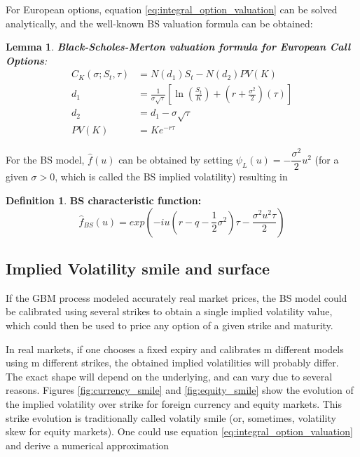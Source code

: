 \documentclass[12,twoside]{mammeTFM}
\newtheorem{lem}[thm]{Lemma}
\theoremstyle{definition}
\newtheorem{definition}[thm]{Definition}
\theoremstyle{remark}
\begin{document}
For European options, equation \ref{eq:integral_option_valuation} can be solved analytically, and the well-known BS valuation formula can be obtained:

\begin{lem} \textbf{Black-Scholes-Merton valuation formula for European Call Options}:
\begin{align}
  C_K(\sigma; S_t, \tau) &= N(d_1)S_t - N(d_2) PV(K) \\
     d_1 &= \frac{1}{\sigma\sqrt{\tau}}\left[\ln\left(\frac{S_t}{K}\right) + \left(r + \frac{\sigma^2}{2}\right)(\tau)\right] \\
     d_2 &= d_1 - \sigma\sqrt{\tau} \\
PV(K) &=Ke^{-r\tau}
\end{align}
\end{lem}

For the BS model, $\hat{f}(u)$ can be obtained by setting $\psi_L (u) = -\dfrac{\sigma^2}{2}u^2$ (for a given $\sigma > 0$, which is called the BS implied volatility) resulting in
\begin{definition} \textbf{BS characteristic function:}
\begin{equation}
\hat{f}_{BS}(u) = exp{\left(-iu \left( r-q - \dfrac{1}{2}\sigma^2 \right) \tau - \dfrac{\sigma^2 u^2 \tau}{2} \right)}
\end{equation}
\end{definition}

\subsection{Implied Volatility smile and surface} \label{subsec:smile_and_surf}
If the GBM process modeled accurately real market prices, the BS model could be calibrated using several strikes to obtain a single implied volatility value, which could then be used to price any option of a given strike and maturity. 

In real markets, if one chooses a fixed expiry and calibrates m different models using m different strikes, the obtained implied volatilities will probably differ. The exact shape will depend on the underlying, and can vary due to several reasons. Figures \ref{fig:currency_smile} and \ref{fig:equity_smile} show the evolution of the implied volatility over strike for foreign currency and equity markets. This strike evolution is traditionally called volatily smile (or, sometimes, volatility skew for equity markets). One could use equation \ref{eq:integral_option_valuation} and derive a numerical approximation  
\end{document}
